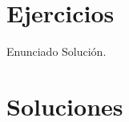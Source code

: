 



\newpage





\section{Ejercicios}

\tcbstartrecording
\begin{texercise}
	Enunciado
	\tcblower 
    Solución.
\end{texercise}

\tcbstoprecording

\section{{Soluciones}}

\tcbinputrecords